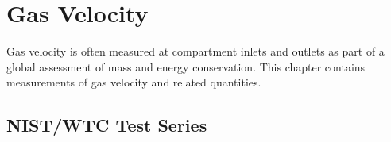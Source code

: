 \chapter{Gas Velocity}

Gas velocity is often measured at compartment inlets and outlets as part of a global assessment of mass and
energy conservation.  This chapter contains measurements of gas velocity and related quantities.



\section{NIST/WTC Test Series}



\clearpage
